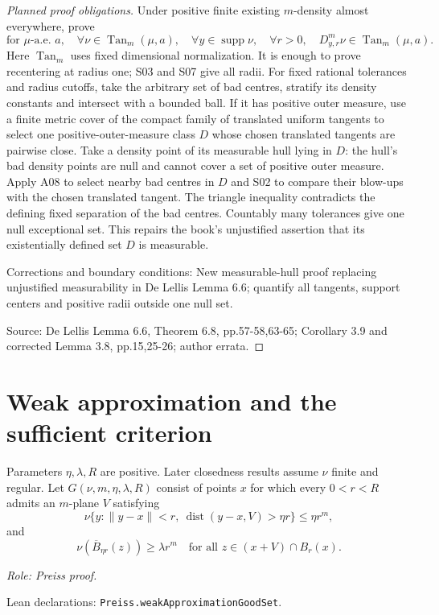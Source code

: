\begin{proof}[Planned proof obligations]

Under positive finite existing $m$-density almost everywhere, prove
\[
 \text{for }\mu\text{-a.e. }a,\quad
 \forall\nu\in\operatorname{Tan}_m(\mu,a),\quad
 \forall y\in\operatorname{supp}\nu,\quad\forall r>0,
 \quad D^m_{y,r}\nu\in\operatorname{Tan}_m(\mu,a).
\]
Here $\operatorname{Tan}_m$ uses fixed dimensional normalization.
It is enough to prove recentering at radius one; S03 and S07 give all radii.
For fixed rational tolerances and radius cutoffs, take the arbitrary set of
bad centres, stratify its density constants and intersect with a bounded ball.
If it has positive outer measure, use a finite metric cover of the compact
family of translated uniform tangents to select one positive-outer-measure
class $D$ whose chosen translated tangents are pairwise close.
Take a density point of its measurable hull lying in $D$: the hull's bad
density points are null and cannot cover a set of positive outer measure.
Apply A08 to select nearby bad centres in $D$ and S02 to compare their blow-ups
with the chosen translated tangent. The triangle inequality contradicts the
defining fixed separation of the bad centres. Countably many tolerances give
one null exceptional set. This repairs the book's unjustified assertion that
its existentially defined set $D$ is measurable.
\par Corrections and boundary conditions: New measurable-hull proof replacing unjustified measurability in De Lellis Lemma 6.6; quantify all tangents, support centers and positive radii outside one null set.
\par Source: De Lellis Lemma 6.6, Theorem 6.8, pp.57-58,63-65; Corollary 3.9 and corrected Lemma 3.8, pp.15,25-26; author errata.
\end{proof}

\section{Weak approximation and the sufficient criterion}

\begin{definition}
\label{def:weak-approximation-good-set}








Parameters \(\eta,\lambda,R\) are positive. Later closedness results assume \(\nu\) finite and regular.
Let \(G(\nu,m,\eta,\lambda,R)\) consist of points \(x\) for which every \(0<r<R\) admits an \(m\)-plane \(V\) satisfying
\[
 \nu\{y:\|y-x\|<r,\ \operatorname{dist}(y-x,V)>\eta r\}\leq\eta r^m,
\]
and
\[
 \nu(\overline B_{\eta r}(z))\geq\lambda r^m
 \quad\text{for all }z\in(x+V)\cap B_r(x).
\]
\par\emph{Role: Preiss proof.}
\par Lean declarations: \texttt{Preiss.weakApproximationGoodSet}.
\end{definition}

